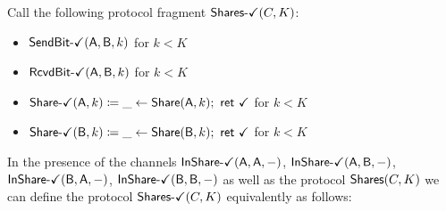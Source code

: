 Call the following protocol fragment $\SharesOk(C,K)$:
\begin{itemize}
\item {\color{teal} $\SendBitOk(\A,\B,k)$ for $k < K$}
\item {\color{teal} $\RcvdBitOk(\A,\B,k)$ for $k < K$}
\item {\color{teal} $\ShareOk(\A,k) \coloneqq \_ \leftarrow \Share(\A,k); \ \ret{\checkmark}$ for $k < K$}
\item {\color{teal} $\ShareOk(\B,k) \coloneqq \_ \leftarrow \Share(\B,k); \ \ret{\checkmark}$ for $k < K$}
\end{itemize}

\noindent In the presence of the channels $\InShareOk(\A,\A,-)$, $\InShareOk(\A,\B,-)$, $\InShareOk(\B,\A,-)$, $\InShareOk(\B,\B,-)$ as well as the protocol $\Shares(C,K)$ we can define the protocol $\SharesOk(C,K)$ equivalently as follows:

